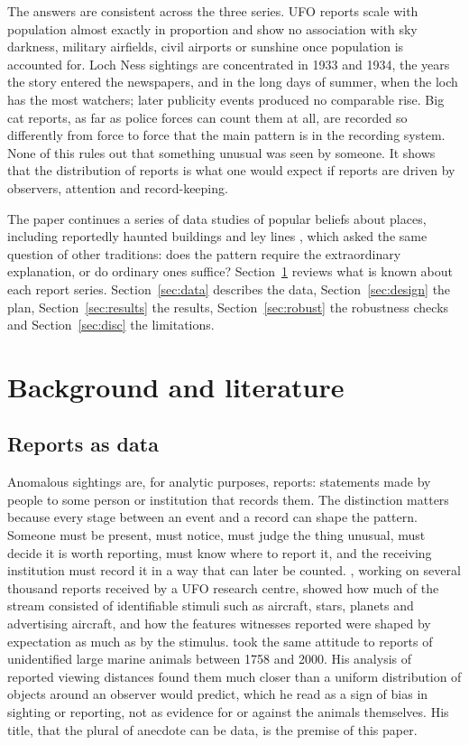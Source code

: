 \documentclass[11pt,a4paper]{article}
\begin{document}
The answers are consistent across the three series. UFO reports scale with population almost exactly in proportion and show no association with sky darkness, military airfields, civil airports or sunshine once population is accounted for. Loch Ness sightings are concentrated in 1933 and 1934, the years the story entered the newspapers, and in the long days of summer, when the loch has the most watchers; later publicity events produced no comparable rise. Big cat reports, as far as police forces can count them at all, are recorded so differently from force to force that the main pattern is in the recording system. None of this rules out that something unusual was seen by someone. It shows that the distribution of reports is what one would expect if reports are driven by observers, attention and record-keeping.

The paper continues a series of data studies of popular beliefs about places, including reportedly haunted buildings \citep{hotham2026ghosts} and ley lines \citep{hotham2026ley}, which asked the same question of other traditions: does the pattern require the extraordinary explanation, or do ordinary ones suffice? Section~\ref{sec:lit} reviews what is known about each report series. Section~\ref{sec:data} describes the data, Section~\ref{sec:design} the plan, Section~\ref{sec:results} the results, Section~\ref{sec:robust} the robustness checks and Section~\ref{sec:disc} the limitations.

\section{Background and literature}\label{sec:lit}
\subsection{Reports as data}
Anomalous sightings are, for analytic purposes, reports: statements made by people to some person or institution that records them. The distinction matters because every stage between an event and a record can shape the pattern. Someone must be present, must notice, must judge the thing unusual, must decide it is worth reporting, must know where to report it, and the receiving institution must record it in a way that can later be counted. \citet{hendry1979}, working on several thousand reports received by a UFO research centre, showed how much of the stream consisted of identifiable stimuli such as aircraft, stars, planets and advertising aircraft, and how the features witnesses reported were shaped by expectation as much as by the stimulus. \citet{paxton2009} took the same attitude to reports of unidentified large marine animals between 1758 and 2000. His analysis of reported viewing distances found them much closer than a uniform distribution of objects around an observer would predict, which he read as a sign of bias in sighting or reporting, not as evidence for or against the animals themselves. His title, that the plural of anecdote can be data, is the premise of this paper.
\end{document}
